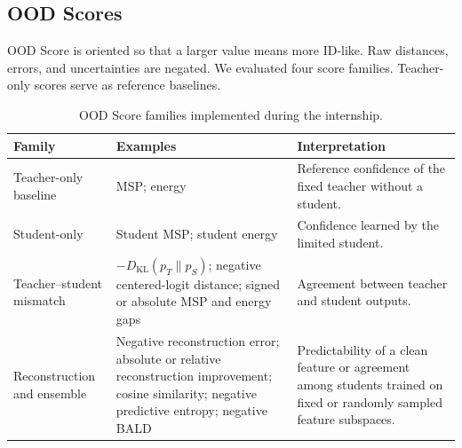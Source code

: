 \subsection{OOD Scores}

\headingindent
OOD Score is oriented so that a larger value means more ID-like.
Raw distances, errors, and uncertainties are negated. We evaluated four score
families. Teacher-only scores serve as reference baselines.

\begin{table}[ht]
\centering
{}
\begin{tabularx}{\textwidth}{@{}L{3.0cm}L{4.0cm}Y@{}}
\toprule
Family & Examples & Interpretation \\
\midrule
Teacher-only baseline & MSP; energy \cite{liu2020energy} & Reference confidence
of the fixed teacher without a student. \\
Student-only & Student MSP; student energy & Confidence learned by the limited student. \\
Teacher--student mismatch & $-D_{\mathrm{KL}}(p_T\parallel p_S)$; negative
centered-logit distance; signed or absolute MSP and energy gaps & Agreement
between teacher and student outputs. \\
Reconstruction and ensemble & Negative reconstruction error; absolute or
relative reconstruction improvement; cosine similarity; negative predictive
entropy; negative BALD & Predictability of a clean feature or agreement among
students trained on fixed or randomly sampled feature subspaces. \\
\bottomrule
\end{tabularx}
\caption{OOD Score families implemented during the internship.}
\label{tab:score-families}
\end{table}
